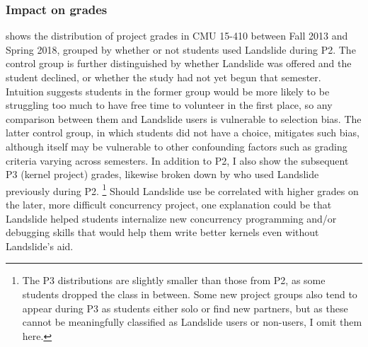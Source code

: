 \subsubsection{Impact on grades}

 shows the distribution of project grades in CMU 15-410
between Fall 2013 and Spring 2018,
grouped by whether or not students used Landslide during P2.
The control group is further distinguished by whether Landslide was offered and the student declined,
or whether the study had not yet begun that semester.
Intuition suggests students in the former  group would be more likely
to be struggling too much to have free time to volunteer in the first place,
so any comparison between them and Landslide users is vulnerable to selection bias.
The latter control group, in which students did not have a choice, mitigates such bias,
although itself may be vulnerable to other confounding factors such as grading criteria varying across semesters.
%
In addition to P2, I also show the subsequent P3 (kernel project) grades,
likewise broken down by who used Landslide previously during P2.%
\footnote{The P3 distributions are slightly smaller than those from P2,
as some students dropped the class in between.
Some new project groups also tend to appear during P3 as students either solo or find new partners,
but as these cannot be meaningfully classified as Landslide users or non-users,
I omit them here.
}
Should Landslide use be correlated with higher grades on the later, more difficult concurrency project,
one explanation could be that Landslide helped students
internalize new concurrency programming and/or debugging skills
that would help them write better kernels even without Landslide's aid.

